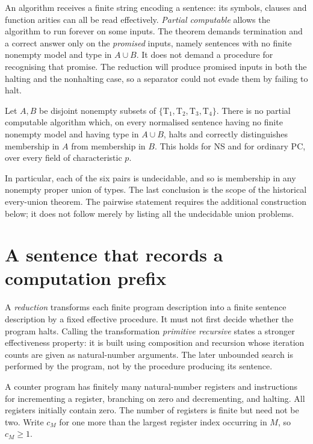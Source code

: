 An algorithm receives a finite string encoding a sentence: its symbols,
clauses and function arities can all be read effectively. \emph{Partial
computable} allows the algorithm to run forever on some inputs.
The theorem demands termination and a correct answer only on the
\emph{promised} inputs, namely sentences with no finite nonempty model
and type in $A\cup B$. It does not demand a procedure for recognising
that promise. The reduction will produce promised inputs in both
the halting and the nonhalting case, so a separator could not evade
them by failing to halt.

\begin{theorem}\label{tx:thm:undecidability}
Let $A,B$ be disjoint nonempty subsets of $\{\mathrm T_1,\mathrm T_2,
\mathrm T_3,\mathrm T_4\}$. There is no partial computable algorithm which,
on every normalised sentence having no finite nonempty model and having
type in $A\cup B$, halts and correctly distinguishes membership in $A$
from membership in $B$. This holds for NS and for ordinary PC, over every
field of characteristic $p$.
\end{theorem}

In particular, each of the six pairs is undecidable, and so is membership
in any nonempty proper union of types. The last conclusion is the scope
of the historical every-union theorem. The pairwise statement requires the
additional construction below; it does not follow merely by listing all
the undecidable union problems.

\section{A sentence that records a computation prefix}
A \emph{reduction} transforms each finite program description into a
finite sentence description by a fixed effective procedure. It must
not first decide whether the program halts. Calling the transformation
\emph{primitive recursive} states a stronger effectiveness property:
it is built using composition and recursion whose iteration counts
are given as natural-number arguments. The later unbounded search is performed by the
program, not by the procedure producing its sentence.

A counter program has finitely many natural-number registers and instructions
for incrementing a register, branching on zero and decrementing, and halting.
All registers initially contain zero. The number of registers is finite
but need not be two. Write $c_M$ for one more than the largest register index
occurring in $M$, so $c_M\ge1$.


